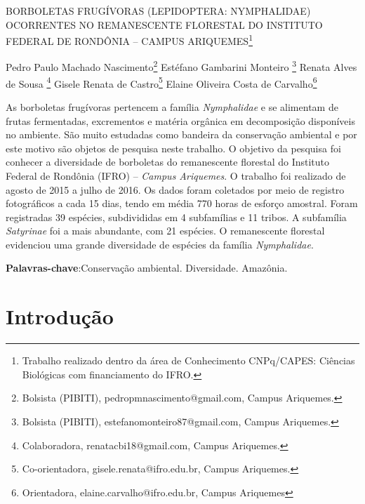 \documentclass[article,12pt,onesidea,4paper,english,brazil]{abntex2}
\begin{document}
	
	
	\frenchspacing 
	
	\begin{center}
		\LARGE BORBOLETAS FRUGÍVORAS (LEPIDOPTERA: NYMPHALIDAE) OCORRENTES NO REMANESCENTE FLORESTAL DO INSTITUTO FEDERAL DE RONDÔNIA – CAMPUS ARIQUEMES\footnote{Trabalho realizado dentro da área de Conhecimento CNPq/CAPES: Ciências Biológicas com financiamento do IFRO.}
		
		\normalsize
		Pedro Paulo Machado Nascimento\footnote{Bolsista (PIBITI), pedropmnascimento@gmail.com, Campus Ariquemes.} 
		Estéfano Gambarini Monteiro \footnote{Bolsista (PIBITI), estefanomonteiro87@gmail.com, Campus Ariquemes.} 
		Renata Alves de Sousa \footnote{Colaboradora, renatacbi18@gmail.com, Campus Ariquemes.} 
	Gisele Renata de Castro\footnote{Co-orientadora, gisele.renata@ifro.edu.br, Campus Ariquemes.} 
	Elaine Oliveira Costa de Carvalho\footnote{Orientadora, elaine.carvalho@ifro.edu.br, Campus Ariquemes}
	\end{center}
	
	\begin{resumoumacoluna}
		As borboletas frugívoras pertencem a família \textit{Nymphalidae} e se alimentam de frutas fermentadas, excrementos e matéria orgânica em decomposição disponíveis no ambiente. São muito estudadas como bandeira da conservação ambiental e por este motivo são objetos de pesquisa neste trabalho. O objetivo da pesquisa foi conhecer a diversidade de borboletas do remanescente florestal do Instituto Federal de Rondônia (IFRO) – \textit{Campus Ariquemes}. O trabalho foi realizado de agosto de 2015 a julho de 2016. Os dados foram coletados por meio de registro fotográficos a cada 15 dias, tendo em média 770 horas de esforço amostral. Foram registradas 39 espécies, subdivididas em 4 subfamílias e 11 tribos. A subfamília \textit{Satyrinae} foi a mais abundante, com 21 espécies. O remanescente florestal evidenciou uma grande diversidade de espécies da família \textit{Nymphalidae}.
		
		\vspace{\onelineskip}
		
		\noindent
		\textbf{Palavras-chave}:Conservação ambiental. Diversidade. Amazônia.
		
	\end{resumoumacoluna}
	
	\textual
	
	\section*{Introdução}
	
\end{document}

